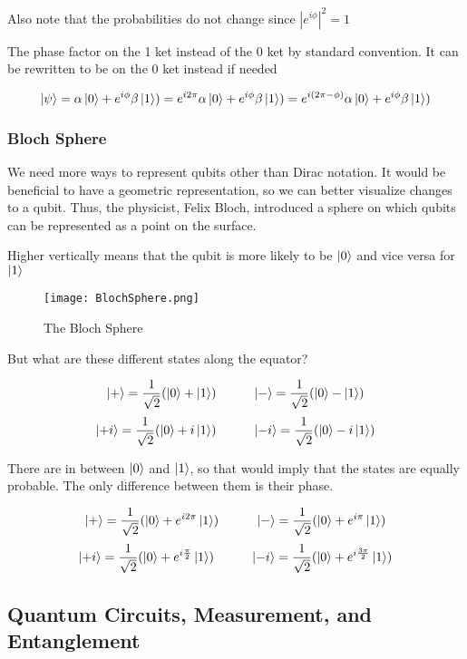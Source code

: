 \documentclass[12pt]{article}
\begin{document}
Also note that the probabilities do not change since $|e^{i\phi}|^2 = 1$

The phase factor on the 1 ket instead of the 0 ket by standard convention. It can be rewritten to be on the 0 ket instead if needed

$$
\ket{\psi} = \alpha \ket{0} + e^{i\phi} \beta \ket{1}) = e^{i2\pi} \alpha \ket{0} + e^{i\phi} \beta \ket{1}) = e^{i(2\pi - \phi)} \alpha \ket{0} + e^{i\phi} \beta \ket{1})
$$


\subsubsection{Bloch Sphere}

We need more ways to represent qubits other than Dirac notation. It would be beneficial to have a geometric representation, so we can better visualize changes to a qubit. Thus, the physicist, Felix Bloch, introduced a sphere on which qubits can be represented as a point on the surface.

Higher vertically means that the qubit is more likely to be $\ket{0}$ and vice versa for $\ket{1}$

\begin{figure}[h]
    \centering
    \texttt{[image: BlochSphere.png]}
    \caption{The Bloch Sphere}
    \cite{Bloch_Sphere}
    \label{fig:Bloch_Sphere}
\end{figure}


But what are these different states along the equator? 

$$
\ket{+} = \frac{1}{\sqrt{2}}( \ket{0}  + \ket{1})
\hspace{1cm}
\ket{-} = \frac{1}{\sqrt{2}}( \ket{0}  - \ket{1})
$$
$$
\ket{+i} = \frac{1}{\sqrt{2}}( \ket{0}  + i\ket{1})
\hspace{1cm}
\ket{-i} = \frac{1}{\sqrt{2}}( \ket{0}  - i\ket{1})
$$

There are in between $\ket{0}$ and $\ket{1}$, so that would imply that the states are equally probable. The only difference between them is their phase. 

$$
\ket{+} = \frac{1}{\sqrt{2}}( \ket{0}  + e^{i 2\pi}\ket{1})
\hspace{1cm}
\ket{-} = \frac{1}{\sqrt{2}}( \ket{0}  + e^{i \pi}\ket{1})
$$
$$
\ket{+i} = \frac{1}{\sqrt{2}}( \ket{0}  + e^{i \frac{\pi}{2}}\ket{1})
\hspace{1cm}
\ket{-i} = \frac{1}{\sqrt{2}}( \ket{0}  + e^{i \frac{3\pi}{2}} \ket{1})
$$


\subsection{Quantum Circuits, Measurement, and Entanglement}
\end{document}
